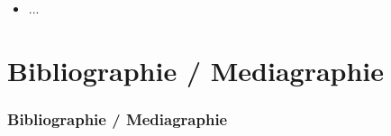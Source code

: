 \documentclass{beamer}
\begin{document}
\def\titleSection4SubsectionI{}
\subsection{ \titleSection4SubsectionI }
\begin{frame}
	\frametitle{ \titleSection4SubsectionI }
	\begin{itemize}
		\item ... 
	\end{itemize}
\end{frame}


\def\sectionPartBibliographie{Bibliographie / Mediagraphie}
\section{\sectionPartBibliographie}
\begin{frame}[allowframebreaks]
	\frametitle{\sectionPartBibliographie}
	\nocite{*}
	
	
\end{frame}
\end{document}
